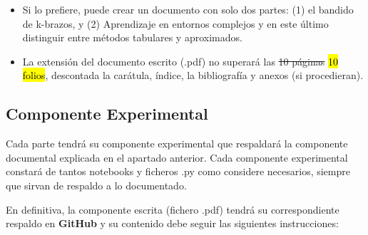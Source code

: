 \documentclass[a4paper, 11pt]{article}
\newcommand\tachar[1]{\emoji{scissors}\st{#1}}
\begin{document}
\begin{enumerate}
\begin{importantbox}
\begin{itemize}
\item Si lo prefiere, puede crear un documento con solo dos partes: (1) el bandido de k-brazos, y (2) Aprendizaje en entornos complejos y en este último distinguir entre métodos tabulares y aproximados.

\item La extensión del documento escrito (.pdf) no superará las \tachar{10 páginas} \hl{10 folios}, descontada la carátula, índice, la bibliografía y anexos (si procedieran).

\end{itemize}
\end{importantbox}

\end{enumerate}



\subsection{Componente Experimental}

Cada parte tendrá su componente experimental que respaldará la componente documental explicada en el apartado anterior. Cada componente experimental constará de tantos notebooks y ficheros .py como considere necesarios, siempre que sirvan de respaldo a lo documentado.

En definitiva, la componente escrita (fichero .pdf) tendrá su correspondiente respaldo en \textbf{GitHub} y su contenido debe seguir las siguientes instrucciones:
\end{document}
